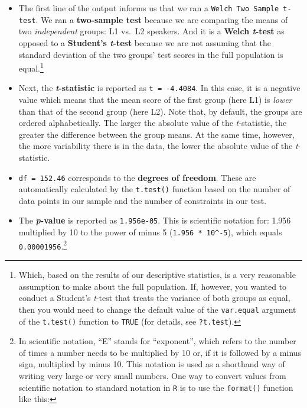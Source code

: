 \documentclass[
  letterpaper,
  DIV=11,
  numbers=noendperiod]{scrreprt}
\begin{document}
\begin{itemize}
\item
  The first line of the output informs us that we ran a
  \texttt{Welch\ Two\ Sample\ t-test}. We ran a \textbf{two-sample test}
  because we are comparing the means of two \emph{independent} groups:
  L1 vs.~L2 speakers. And it is a \textbf{Welch \emph{t}-test} as
  opposed to a \textbf{Student's \emph{t}-test} because we are not
  assuming that the standard deviation of the two groups' test scores in
  the full population is equal.\footnote{Which, based on the results of
    our descriptive statistics, is a very reasonable assumption to make
    about the full population. If, however, you wanted to conduct a
    Student's \emph{t}-test that treats the variance of both groups as
    equal, then you would need to change the default value of the
    \texttt{var.equal} argument of the \texttt{t.test()} function to
    \texttt{TRUE} (for details, see \texttt{?t.test}).}
\item
  Next, the \textbf{\emph{t}-statistic} is reported as
  \texttt{t\ =\ -4.4084}. In this case, it is a negative value which
  means that the mean score of the first group (here L1) is \emph{lower}
  than that of the second group (here L2). Note that, by default, the
  groups are ordered alphabetically. The larger the absolute value of
  the \emph{t}-statistic, the greater the difference between the group
  means. At the same time, however, the more variability there is in the
  data, the lower the absolute value of the \emph{t}-statistic.
\item
  \texttt{df\ =\ 152.46} corresponds to the \textbf{degrees of freedom}.
  These are automatically calculated by the \texttt{t.test()} function
  based on the number of data points in our sample and the number of
  constraints in our test.
\item
  The \textbf{\emph{p}-value} is reported as \texttt{1.956e-05}. This is
  scientific notation for: 1.956 multiplied by 10 to the power of minus
  5 (\texttt{1.956~*~10\^{}-5}), which equals
  \texttt{0.00001956}.\footnote{In scientific notation, ``E'' stands for
    ``exponent'', which refers to the number of times a number needs to
    be multiplied by 10 or, if it is followed by a minus sign,
    multiplied by minus 10. This notation is used as a shorthand way of
    writing very large or very small numbers. One way to convert values
    from scientific notation to standard notation in \texttt{R} is to
    use the \texttt{format()} function like this:

}
\end{itemize}
\end{document}
